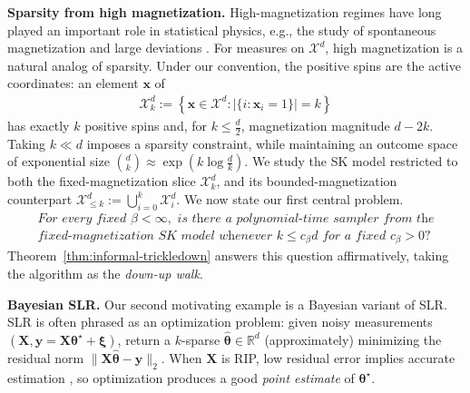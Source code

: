 \documentclass[11pt]{article}
\newcommand{\defeq}{:=}
\newcommand{\norms}[1]{\lVert#1\rVert}
\newcommand{\R}{\mathbb{R}}
\newcommand{\1}{\mathbf{1}}
\newcommand{\0}{\mathbf{0}}
\newcommand{\Brace}[1]{\left\{#1\right\}}
\newcommand{\rd}{\color{red}}
\newcommand{\bk}{\color{black}}
\newcommand{\vth}{\boldsymbol{\theta}}
\newcommand{\vxi}{\boldsymbol{\xi}}
\newcommand{\vths}{\vth^\star}
\newcommand{\vhth}{\widehat{\vth}}
\newcommand{\mx}{{\mathbf{X}}}
\newcommand{\vx}{{\mathbf{x}}}
\newcommand{\vy}{{\mathbf{y}}}
\newcommand{\calX}{{\mathcal{X}}}
\newcommand{\ba}[1]{\begin{align}#1\end{align}}
\begin{document}
\textbf{Sparsity from high magnetization.}
High-magnetization regimes  have long played an important role in statistical physics, e.g., the study of spontaneous magnetization and large deviations \cite{yang1952,Bonati2014,Aizenman_2014,Ellis12}. For measures on $\calX^d$, high magnetization is a natural analog of sparsity. Under our convention, the positive spins are the active coordinates: an element $\vx$ of
\ba{\label{eq:Xdk}
    \calX^d_k
    \defeq
    \Brace{
        \vx\in\calX^d:
        \bigl|\{i:\vx_i=1\}\bigr|=k
    }
}
has exactly \(k\) positive spins and, for \(k\leq \frac d 2\), magnetization magnitude \(d-2k\). Taking \(k\ll d\) imposes a sparsity constraint, while maintaining an outcome space of exponential size \(\binom{d}{k} \approx \exp(k\log \tfrac{d}{k})\). We study the SK model restricted to both the fixed-magnetization slice $\calX^d_k$, and its bounded-magnetization counterpart
    $\calX^d_{\leq k}
    \defeq
    \bigcup_{i=0}^k \calX^d_i.$ 
We now state our first central problem.
\begin{gather*}
\textit{For every fixed } \beta < \infty, \textit{ is there a polynomial-time sampler from the} \\
\textit{fixed-magnetization SK model  whenever } k\le c_\beta d \textit{ for a fixed } c_\beta > 0?
\end{gather*}
Theorem~\ref{thm:informal-trickledown} answers this question affirmatively, taking the algorithm as the \emph{down-up walk}. %

\textbf{Bayesian SLR.}
Our second motivating example is a Bayesian variant of SLR. SLR is often phrased as an optimization problem: given noisy measurements $(\mx, \vy = \mx \vths + \vxi)$, return a $k$-sparse $\vhth \in \R^d$ (approximately) minimizing the residual norm $\norms{\mx\vhth - \vy}_2$. When $\mx$ is RIP, low residual error implies accurate estimation \cite{CandesRT06}, so optimization produces a good \emph{point estimate} of $\vths$. 
\end{document}
